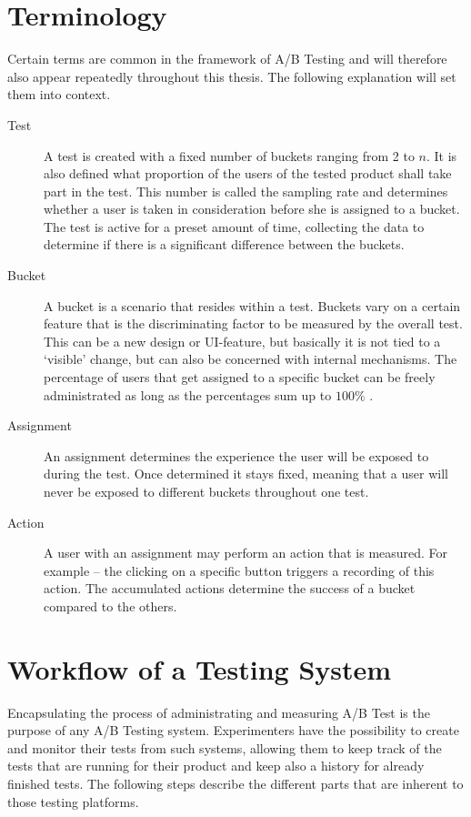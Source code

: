 \documentclass[main.tex]{subfiles}
\begin{document}
\section{Terminology}
Certain terms are common in the framework of A/B Testing and will therefore also appear repeatedly throughout this thesis. The following explanation will set them into context.
\begin{description}
\item[Test]
A test is created with a fixed number of buckets ranging from 2 to $n$. It is also defined what proportion of the users of the tested product shall take part in the test. This number is called the sampling rate and determines whether a user is taken in consideration before she is assigned to a bucket. The test is active for a preset amount of time, collecting the data to determine if there is a significant difference between the buckets.
\item[Bucket]
A bucket is a scenario that resides within a test. Buckets vary on a certain feature that is the discriminating factor to be measured by the overall test. This can be a new design or UI-feature, but basically it is not tied to a `visible' change, but can also be concerned with internal mechanisms. The percentage of users that get assigned to a specific bucket can be freely administrated as long as the percentages sum up to $100\%$ .
\item[Assignment]
An assignment determines the experience the user will be exposed to during the test. Once determined it stays fixed, meaning that a user will never be exposed to different buckets throughout one test.
\item[Action]
A user with an assignment may perform an action that is measured. For example -- the clicking on a specific button triggers a recording of this action. The accumulated actions determine the success of a bucket compared to the others. 
\end{description}
\section{Workflow of a Testing System}
Encapsulating the process of administrating and measuring A/B Test is the purpose of any A/B Testing system. Experimenters have the possibility to create and monitor their tests from such systems, allowing them to keep track of the tests that are running for their product and keep also a history for already finished tests. The following steps describe the different parts that are inherent to those testing platforms.
\end{document}
